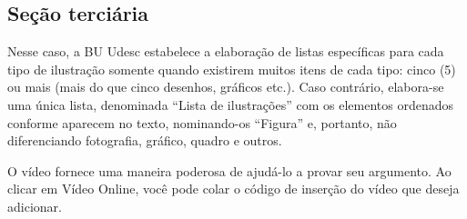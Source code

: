 \subsection{Seção terciária}

Nesse caso, a BU Udesc estabelece a elaboração de listas específicas para cada tipo de ilustração somente quando existirem muitos itens de cada tipo: cinco (5) ou mais (mais do que cinco desenhos, gráficos etc.). Caso contrário, elabora-se uma única lista, denominada “Lista de ilustrações” com os elementos ordenados conforme aparecem no texto, nominando-os “Figura” e, portanto, não diferenciando fotografia, gráfico, quadro e outros.

O vídeo fornece uma maneira poderosa de ajudá-lo a provar seu argumento. Ao clicar em Vídeo Online, você pode colar o código de inserção do vídeo que deseja adicionar.





